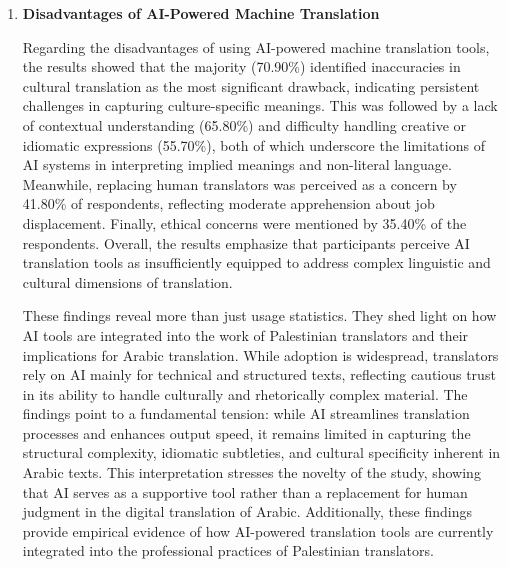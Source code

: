 \documentclass[english]{textolivre}
\begin{document}
\begin{enumerate}
Participants identified key advantages of using AI-powered machine translation tools. The majority (79.70\%) highlighted improving translation speed as the most prominent benefit. This emphasizes AI’s ability to offer quick results and enhance workflow efficiency. It was followed by increased translators' productivity (51.90\%) and handling large volumes of texts (41.80\%). A smaller proportion of respondents mentioned increasing consistency in translation (27.80\%) and enhancing translation accuracy (25.30\%). This suggests that while AI translation tools are recognized for operational efficiency, their linguistic precision is viewed with moderate confidence. Overall, these findings indicate that translators primarily value AI technologies for their speed and productivity benefits rather than for improvements in linguistic or contextual quality.

\item \textbf{Disadvantages of AI-Powered Machine Translation}

Regarding the disadvantages of using AI-powered machine translation tools, the results showed that the majority (70.90\%) identified inaccuracies in cultural translation as the most significant drawback, indicating persistent challenges in capturing culture-specific meanings. This was followed by a lack of contextual understanding (65.80\%) and difficulty handling creative or idiomatic expressions (55.70\%), both of which underscore the limitations of AI systems in interpreting implied meanings and non-literal language. Meanwhile, replacing human translators was perceived as a concern by 41.80\% of respondents, reflecting moderate apprehension about job displacement. Finally, ethical concerns were mentioned by 35.40\% of the respondents. Overall, the results emphasize that participants perceive AI translation tools as insufficiently equipped to address complex linguistic and cultural dimensions of translation.

These findings reveal more than just usage statistics. They shed light on how AI tools are integrated into the work of Palestinian translators and their implications for Arabic translation. While adoption is widespread, translators rely on AI mainly for technical and structured texts, reflecting cautious trust in its ability to handle culturally and rhetorically complex material. The findings point to a fundamental tension: while AI streamlines translation processes and enhances output speed, it remains limited in capturing the structural complexity, idiomatic subtleties, and cultural specificity inherent in Arabic texts. This interpretation stresses the novelty of the study, showing that AI serves as a supportive tool rather than a replacement for human judgment in the digital translation of Arabic. Additionally, these findings provide empirical evidence of how AI-powered translation tools are currently integrated into the professional practices of Palestinian translators.
\end{enumerate}
\end{document}
